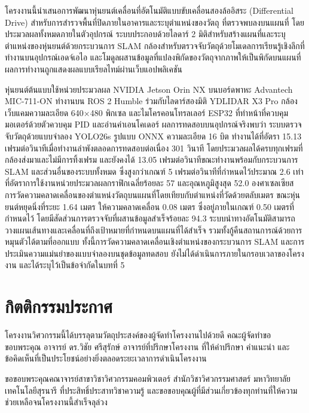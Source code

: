 \documentclass[a4paper,12pt]{report}
\begin{document}
โครงงานนี้นำเสนอการพัฒนาหุ่นยนต์เคลื่อนที่อัตโนมัติแบบขับเคลื่อนสองล้ออิสระ
(Differential Drive) สำหรับการสำรวจพื้นที่ปิดภายในอาคารและระบุตำแหน่งของวัตถุ
ที่ตรวจพบลงบนแผนที่ โดยประมวลผลทั้งหมดภายในตัวอุปกรณ์
ระบบประกอบด้วยไลดาร์ 2 มิติสำหรับสร้างแผนที่และระบุตำแหน่งของหุ่นยนต์ด้วยกระบวนการ SLAM
กล้องสำหรับตรวจจับวัตถุด้วยโมเดลการเรียนรู้เชิงลึกที่ทำงานบนอุปกรณ์เอดจ์เอไอ
และโมดูลผสานข้อมูลที่แปลงพิกัดของวัตถุจากภาพให้เป็นพิกัดบนแผนที่
ผลการทำงานถูกแสดงผลแบบเรียลไทม์ผ่านเว็บแอปพลิเคชัน

หุ่นยนต์ต้นแบบใช้หน่วยประมวลผล NVIDIA Jetson Orin NX บนบอร์ดพาหะ Advantech MIC-711-ON
ทำงานบน ROS 2 Humble ร่วมกับไลดาร์สองมิติ YDLIDAR X3 Pro กล้องเว็บแคมความละเอียด
640$\times$480 พิกเซล และไมโครคอนโทรลเลอร์ ESP32 ที่ทำหน้าที่ควบคุมมอเตอร์ด้วยตัวควบคุม PID
และอ่านค่าเอนโคเดอร์ ผลการทดสอบบนอุปกรณ์จริงพบว่า
ระบบตรวจจับวัตถุด้วยแบบจำลอง YOLO26s รูปแบบ ONNX ความละเอียด 16 บิต
ทำงานได้ที่อัตรา 15.13 เฟรมต่อวินาทีเมื่อทำงานลำพังตลอดการทดสอบต่อเนื่อง 301 วินาที
โดยประมวลผลได้ครบทุกเฟรมที่กล้องส่งมาและไม่มีการทิ้งเฟรม
และยังคงได้ 13.05 เฟรมต่อวินาทีขณะทำงานพร้อมกับกระบวนการ SLAM และส่วนอื่นของระบบทั้งหมด
ซึ่งสูงกว่าเกณฑ์ 5 เฟรมต่อวินาทีที่กำหนดไว้ประมาณ 2.6 เท่า
ที่อัตราการใช้งานหน่วยประมวลผลกราฟิกเฉลี่ยร้อยละ 57 และอุณหภูมิสูงสุด 52.0 องศาเซลเซียส
การวัดความคลาดเคลื่อนของตำแหน่งวัตถุบนแผนที่โดยเทียบกับตำแหน่งที่วัดด้วยตลับเมตร
ขณะหุ่นยนต์หยุดนิ่งที่ระยะ 1.64 เมตร ให้ความคลาดเคลื่อน 0.08 เมตร
ซึ่งอยู่ภายในเกณฑ์ 0.50 เมตรที่กำหนดไว้ โดยมีสัดส่วนการตรวจจับที่ผสานข้อมูลสำเร็จร้อยละ 94.3
ระบบนำทางอัตโนมัติสามารถวางแผนเส้นทางและเคลื่อนที่ถึงเป้าหมายที่กำหนดบนแผนที่ได้สำเร็จ
รวมทั้งกู้คืนสถานการณ์ด้วยการหมุนตัวได้ตามที่ออกแบบ
ทั้งนี้การวัดความคลาดเคลื่อนเชิงตำแหน่งของกระบวนการ SLAM
และการประเมินความแม่นยำของแบบจำลองบนชุดข้อมูลทดสอบ
ยังไม่ได้ดำเนินการภายในกรอบเวลาของโครงงาน และได้ระบุไว้เป็นข้อจำกัดในบทที่ 5

\chapter*{กิตติกรรมประกาศ}

โครงงานวิศวกรรมนี้ได้บรรลุตามวัตถุประสงค์ของผู้จัดทำโครงงานไปด้วยดี
คณะผู้จัดทำขอขอบพระคุณ อาจารย์ ดร.วิชัย ศรีสุรักษ์ อาจารย์ที่ปรึกษาโครงงาน
ที่ให้คำปรึกษา คำแนะนำ และข้อคิดเห็นที่เป็นประโยชน์อย่างยิ่งตลอดระยะเวลาการดำเนินโครงงาน

ขอขอบพระคุณคณาจารย์สาขาวิชาวิศวกรรมคอมพิวเตอร์ สำนักวิชาวิศวกรรมศาสตร์
มหาวิทยาลัยเทคโนโลยีสุรนารี ที่ประสิทธิ์ประสาทวิชาความรู้
และขอขอบคุณผู้ที่มีส่วนเกี่ยวข้องทุกท่านที่ให้ความช่วยเหลือจนโครงงานนี้สำเร็จลุล่วง
\end{document}
